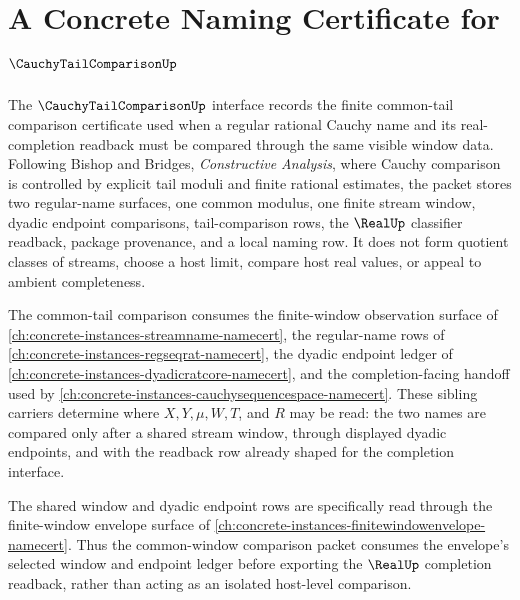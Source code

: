 \chapter{A Concrete Naming Certificate for $\CauchyTailComparisonUp$}
\label{ch:concrete-instances-cauchy-tail-comparison-namecert}

The $\CauchyTailComparisonUp$ interface records the finite common-tail comparison certificate used when a regular rational Cauchy name and its real-completion readback must be compared through the same visible window data. Following Bishop and Bridges, \emph{Constructive Analysis}, where Cauchy comparison is controlled by explicit tail moduli and finite rational estimates, the packet stores two regular-name surfaces, one common modulus, one finite stream window, dyadic endpoint comparisons, tail-comparison rows, the $\RealUp$ classifier readback, package provenance, and a local naming row. It does not form quotient classes of streams, choose a host limit, compare host real values, or appeal to ambient completeness.

The common-tail comparison consumes the finite-window observation surface of \autoref{ch:concrete-instances-streamname-namecert}, the regular-name rows of \autoref{ch:concrete-instances-regseqrat-namecert}, the dyadic endpoint ledger of \autoref{ch:concrete-instances-dyadicratcore-namecert}, and the completion-facing handoff used by \autoref{ch:concrete-instances-cauchysequencespace-namecert}. These sibling carriers determine where $X,Y,\mu,W,T$, and $R$ may be read: the two names are compared only after a shared stream window, through displayed dyadic endpoints, and with the readback row already shaped for the completion interface.

The shared window and dyadic endpoint rows are specifically read through the finite-window envelope surface of \autoref{ch:concrete-instances-finitewindowenvelope-namecert}. Thus the common-window comparison packet consumes the envelope's selected window and endpoint ledger before exporting the $\RealUp$ completion readback, rather than acting as an isolated host-level comparison.

